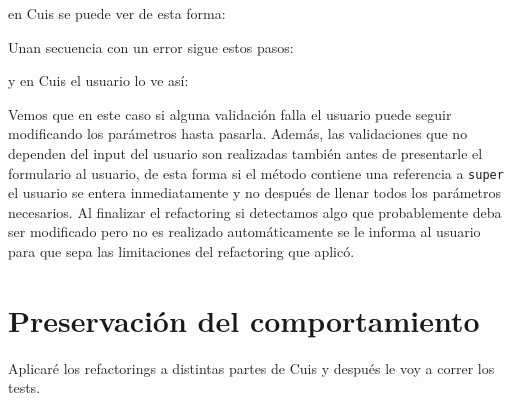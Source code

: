 en Cuis se puede ver de esta forma:


Unan secuencia con un error sigue estos pasos:


y en Cuis el usuario lo ve así:


Vemos que en este caso si alguna validación falla el usuario puede seguir modificando los parámetros
hasta pasarla. Además, las validaciones que no dependen del input del usuario son realizadas también
antes de presentarle el formulario al usuario, de esta forma si el método contiene una referencia a
\lstinline{super} el usuario se entera inmediatamente y no después de llenar todos los parámetros
necesarios. Al finalizar el refactoring si detectamos algo que probablemente deba ser modificado pero
no es realizado automáticamente se le informa al usuario para que sepa las limitaciones del refactoring
que aplicó.


\section{Preservación del comportamiento}
Aplicaré los refactorings a distintas partes de Cuis y después le voy a correr los tests.